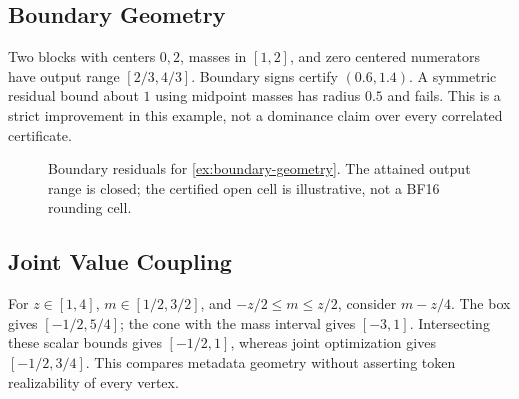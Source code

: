 \FloatBarrier
\subsection{Boundary Geometry}
\label{app:boundary-geometry}
\begin{example}\label{ex:boundary-geometry}
Two blocks with centers $0,2$, masses in $[1,2]$, and zero centered numerators
have output range $[2/3,4/3]$. Boundary signs certify $(0.6,1.4)$. A symmetric
residual bound about $1$ using midpoint masses has radius $0.5$ and fails.
This is a strict improvement in this example, not a dominance claim over
every correlated certificate.
\end{example}

\begin{figure}[!htbp]
 \centering
 
 \caption{Boundary residuals for \cref{ex:boundary-geometry}. The attained
 output range is closed; the certified open cell is illustrative, not a BF16
 rounding cell.}
 \label{fig:boundary-geometry}
\end{figure}

\FloatBarrier
\subsection{Joint Value Coupling}
\label{app:joint-coupling}
\begin{example}\label{ex:joint-coupling}
For $z\in[1,4]$, $m\in[1/2,3/2]$, and $-z/2\le m\le z/2$, consider
$m-z/4$. The box gives $[-1/2,5/4]$; the cone with the mass interval gives
$[-3,1]$. Intersecting these scalar bounds gives $[-1/2,1]$, whereas joint
optimization gives $[-1/2,3/4]$. This compares metadata geometry without
asserting token realizability of every vertex.
\end{example}

\FloatBarrier
